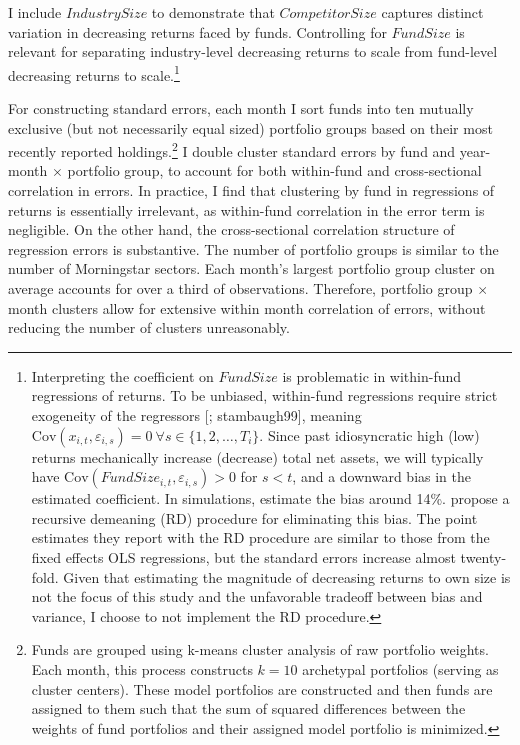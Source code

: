 \documentclass[openany]{book}
\let\rmarkdownfootnote\footnote%
\def\footnote{\protect\rmarkdownfootnote}
\theoremstyle{definition}
\theoremstyle{definition}
\theoremstyle{definition}
\theoremstyle{remark}
\begin{document}
I include \(IndustrySize\) to demonstrate that \(CompetitorSize\)
captures distinct variation in decreasing returns faced by funds.
Controlling for \(FundSize\) is relevant for separating industry-level
decreasing returns to scale from fund-level decreasing returns to
scale.\footnote{Interpreting the coefficient on \(FundSize\) is
  problematic in within-fund regressions of returns. To be unbiased,
  within-fund regressions require strict exogeneity of the regressors
  {[}\citet{chamberlain82}; stambaugh99{]}, meaning
  \(\text{Cov}(x_{i,t},\varepsilon_{i,s})=0 \ \forall s\in\{1,2,\ldots,T_i\}\).
  Since past idiosyncratic high (low) returns mechanically increase
  (decrease) total net assets, we will typically have
  \(\text{Cov}(FundSize_{i,t},\varepsilon_{i,s})>0\) for \(s<t\), and a
  downward bias in the estimated coefficient. In simulations,
  \citet{hl17} estimate the bias around 14\%. \citet{pst15} propose a
  recursive demeaning (RD) procedure for eliminating this bias. The
  point estimates they report with the RD procedure are similar to those
  from the fixed effects OLS regressions, but the standard errors
  increase almost twenty-fold. Given that estimating the magnitude of
  decreasing returns to own size is not the focus of this study and the
  unfavorable tradeoff between bias and variance, I choose to not
  implement the RD procedure.}

For constructing standard errors, each month I sort funds into ten
mutually exclusive (but not necessarily equal sized) portfolio groups
based on their most recently reported holdings.\footnote{Funds are
  grouped using k-means cluster analysis of raw portfolio weights. Each
  month, this process constructs \(k=10\) archetypal portfolios (serving
  as cluster centers). These model portfolios are constructed and then
  funds are assigned to them such that the sum of squared differences
  between the weights of fund portfolios and their assigned model
  portfolio is minimized.} I double cluster standard errors by fund and
year-month \(\times\) portfolio group, to account for both within-fund
and cross-sectional correlation in errors. In practice, I find that
clustering by fund in regressions of returns is essentially irrelevant,
as within-fund correlation in the error term is negligible. On the other
hand, the cross-sectional correlation structure of regression errors is
substantive. The number of portfolio groups is similar to the number of
Morningstar sectors. Each month's largest portfolio group cluster on
average accounts for over a third of observations. Therefore, portfolio
group \(\times\) month clusters allow for extensive within month
correlation of errors, without reducing the number of clusters
unreasonably.
\end{document}
